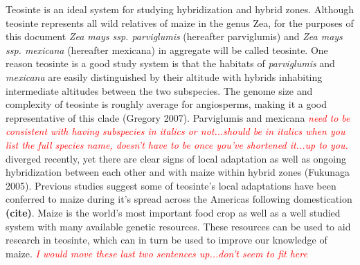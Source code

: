 \documentclass[12pt]{amsart}
\newcommand{\mbh}[1]{\textcolor{red}{ \emph{\scriptsize  #1}} }
\begin{document}
Teosinte is an ideal system for studying hybridization and hybrid zones.  
Although teosinte represents all wild relatives of maize in the genus {Zea}, for the purposes of this document \textit{Zea mays ssp. parviglumis} (hereafter parviglumis) and \textit{Zea mays ssp. mexicana} (hereafter mexicana) in aggregate will be called teosinte. 
One reason teosinte is a good study system is that the habitats of \textit{parviglumis} and \textit{mexicana} are easily distinguished by their altitude with hybrids inhabiting intermediate altitudes between the two subspecies.
The genome size and complexity of teosinte is roughly average for angiosperms, making it a good representative of this clade (Gregory 2007). 
Parviglumis and mexicana \mbh{need to be consistent with having subspecies in italics or not...should be in italics when you list the full species name, doesn't have to be once you've shortened it...up to you.} diverged recently, yet there are clear signs of local adaptation as well as ongoing hybridization between each other and with maize within hybrid zones (Fukunaga 2005).
Previous studies suggest some of teosinte's local adaptations have been conferred to maize during it's spread across the Americas following domestication \textbf{(cite)}.
Maize is the world's most important food crop as well as a well studied system with many available genetic resources.
These resources can be used to aid research in teosinte, which can in turn be used to improve our knowledge of maize. \mbh{I would move these last two sentences up...don't seem to fit here}
\end{document}
